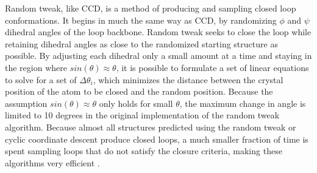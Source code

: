 Random tweak, like CCD, is a method of producing and sampling closed loop conformations.
It begins in much the same way as CCD, by randomizing $\phi$ and $\psi$ dihedral angles of the loop backbone.
Random tweak seeks to close the loop while retaining dihedral angles as close to the randomized starting structure as possible.
By adjusting each dihedral only a small amount at a time and staying in the region where $sin(\theta) \approx \theta$, it is possible to formulate a set of linear equations to solve for a set of $\Delta\theta_{i}$, which minimizes the distance between the crystal position of the atom to be closed and the random position.
Because the assumption $sin(\theta) \approx \theta$ only holds for small $\theta$, the maximum change in angle is limited to 10 degrees in the original implementation of the random tweak algorithm.
Because almost all structures predicted using the random tweak or cyclic coordinate descent produce closed loops, a much smaller fraction of time is spent sampling loops that do not satisfy the closure criteria, making these algorithms very efficient \cite{fine1986predicting,shenkin1987predicting}.
